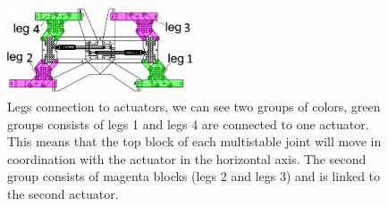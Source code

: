        \begin{figure}
            \centering
            \includegraphics[width=0.5\textwidth]{images/legs_connection.png}
            \caption{Legs connection to actuators, we can see two groups of colors, green groups consists of legs 1 and legs 4 are connected to one actuator. This means that the top block of each multistable joint will move in coordination with the actuator in the horizontal axis. The second group consists of magenta blocks (legs 2 and legs 3) and is linked to the second actuator.}
            \label{fig:legs_connection}
        \end{figure}
